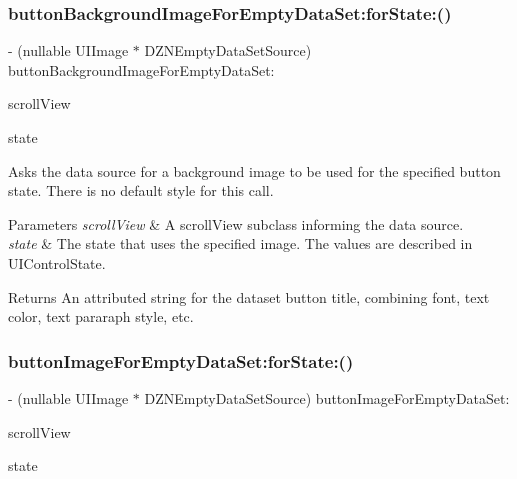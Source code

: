 \subsubsection{\texorpdfstring{button\+Background\+Image\+For\+Empty\+Data\+Set\+:for\+State\+:()}{buttonBackgroundImageForEmptyDataSet:forState:()}}
{\footnotesize\ttfamily -\/ (nullable U\+I\+Image $\ast$ D\+Z\+N\+Empty\+Data\+Set\+Source) button\+Background\+Image\+For\+Empty\+Data\+Set\+: \begin{DoxyParamCaption}\item[{(U\+I\+Scroll\+View $\ast$)}]{scroll\+View }\item[{forState:(U\+I\+Control\+State)}]{state }\end{DoxyParamCaption}\hspace{0.3cm}{\ttfamily [optional]}}

Asks the data source for a background image to be used for the specified button state. There is no default style for this call.


\begin{DoxyParams}{Parameters}
{\em scroll\+View} & A scroll\+View subclass informing the data source. \\
\hline
{\em state} & The state that uses the specified image. The values are described in U\+I\+Control\+State. \\
\hline
\end{DoxyParams}
\begin{DoxyReturn}{Returns}
An attributed string for the dataset button title, combining font, text color, text pararaph style, etc. 
\end{DoxyReturn}
\mbox{\label{protocol_d_z_n_empty_data_set_source_01-p_aa1d924cc39186a1c5283e2cb2df64fb0}} 
\subsubsection{\texorpdfstring{button\+Image\+For\+Empty\+Data\+Set\+:for\+State\+:()}{buttonImageForEmptyDataSet:forState:()}}
{\footnotesize\ttfamily -\/ (nullable U\+I\+Image $\ast$ D\+Z\+N\+Empty\+Data\+Set\+Source) button\+Image\+For\+Empty\+Data\+Set\+: \begin{DoxyParamCaption}\item[{(U\+I\+Scroll\+View $\ast$)}]{scroll\+View }\item[{forState:(U\+I\+Control\+State)}]{state }\end{DoxyParamCaption}\hspace{0.3cm}{\ttfamily [optional]}}

